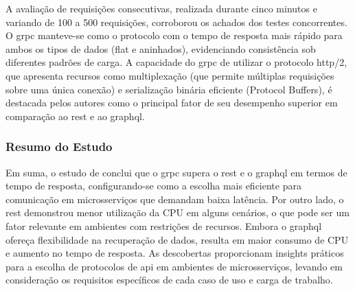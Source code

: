 A avaliação de requisições consecutivas, realizada durante cinco minutos e variando de 100 a 500 requisições, corroborou os achados dos testes concorrentes. O \gls{grpc} manteve-se como o protocolo com o tempo de resposta mais rápido para ambos os tipos de dados (flat e aninhados), evidenciando consistência sob diferentes padrões de carga. A capacidade do \gls{grpc} de utilizar o protocolo \acrshort{http}/2, que apresenta recursos como multiplexação (que permite múltiplas requisições sobre uma única conexão) e serialização binária eficiente (Protocol Buffers), é destacada pelos autores como o principal fator de seu desempenho superior em comparação ao \gls{rest} e ao \acrshort{graphql}.

\subsubsection{Resumo do Estudo}

Em suma, o estudo de \cite{niswar_performance_2024} conclui que o \gls{grpc} supera o \gls{rest} e o \acrshort{graphql} em termos de tempo de resposta, configurando-se como a escolha mais eficiente para comunicação em microsserviços que demandam baixa latência. Por outro lado, o \gls{rest} demonstrou menor utilização da CPU em alguns cenários, o que pode ser um fator relevante em ambientes com restrições de recursos. Embora o \acrshort{graphql} ofereça flexibilidade na recuperação de dados, resulta em maior consumo de CPU e aumento no tempo de resposta. As descobertas proporcionam insights práticos para a escolha de protocolos de \gls{api} em ambientes de microsserviços, levando em consideração os requisitos específicos de cada caso de uso e carga de trabalho.